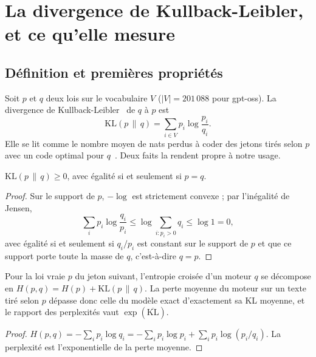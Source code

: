 \section{La divergence de Kullback-Leibler, et ce qu'elle mesure}\label{sec:t2r-kl}

\subsection{Définition et premières propriétés}

Soit $p$ et $q$ deux lois sur le vocabulaire $V$ ($|V| = 201\,088$ pour gpt-oss). La divergence de Kullback-Leibler~\cite{kullback1951} de $q$ à $p$ est
\begin{equation}\label{eq:t2r-kl}
\mathrm{KL}(p \,\|\, q) = \sum_{i \in V} p_i \log\frac{p_i}{q_i}.
\end{equation}
Elle se lit comme le nombre moyen de nats perdus à coder des jetons tirés selon $p$ avec un code optimal pour $q$~\cite{cover2006}. Deux faits la rendent propre à notre usage.

\begin{theoreme}\label{thm:t2r-gibbs}
$\mathrm{KL}(p\,\|\,q) \ge 0$, avec égalité si et seulement si $p = q$.
\end{theoreme}

\begin{proof}
Sur le support de $p$, $-\log$ est strictement convexe ; par l'inégalité de Jensen,
\[
\sum_i p_i \log\frac{q_i}{p_i} \le \log \sum_{i : p_i > 0} q_i \le \log 1 = 0,
\]
avec égalité si et seulement si $q_i/p_i$ est constant sur le support de $p$ et que ce support porte toute la masse de $q$, c'est-à-dire $q = p$.
\end{proof}

\begin{proposition}\label{prop:t2r-croisee}
Pour la loi vraie $p$ du jeton suivant, l'entropie croisée d'un moteur $q$ se décompose en $H(p, q) = H(p) + \mathrm{KL}(p\,\|\,q)$. La perte moyenne du moteur sur un texte tiré selon $p$ dépasse donc celle du modèle exact d'exactement sa KL moyenne, et le rapport des perplexités vaut $\exp(\overline{\mathrm{KL}})$.
\end{proposition}

\begin{proof}
$H(p, q) = -\sum_i p_i \log q_i = -\sum_i p_i \log p_i + \sum_i p_i \log(p_i/q_i)$. La perplexité est l'exponentielle de la perte moyenne.
\end{proof}

